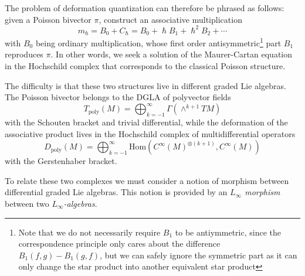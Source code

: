 \documentclass[
  12pt,
  a4paper, oneside
]{report}
\renewcommand{\hbar}{\hslash}
\theoremstyle{bolddef}
\theoremstyle{remark}
\numberwithin{equation}{chapter}
\begin{document}
The problem of deformation quantization can therefore be phrased as follows:
given a Poisson bivector $\pi$, construct an associative multiplication
\begin{equation}
m_{\hbar} = B_{0} + C_{\hbar} = B_{0} + \hbar B_{1} + \hbar^{2} B_{2} + \cdots
\end{equation}
with $B_{0}$ being ordinary multiplication, whose first order antisymmetric\footnote{Note that we do not necessarily require $B_{1}$ to be antiymmetric, since the correspondence principle only cares about the difference $B_{1}(f,g) - B_{1}(g,f)$, but we can safely ignore the symmetric part as it can only change the star product into another equivalent star product} part $B_{1}$ reproduces $\pi$. In other words, we seek
a solution of the Maurer-Cartan equation in the Hochschild complex that
corresponds to the classical Poisson structure.

The difficulty is that these two structures live in different graded Lie
algebras. The Poisson bivector belongs to the DGLA of
polyvector fields
\begin{equation}
T_{\mathrm{poly}}(M) = \bigoplus_{k=-1}^{\infty}
\Gamma(\wedge^{k+1} TM)
\end{equation}
with the Schouten bracket and trivial differential, while the deformation of the associative product lives in the Hochschild complex of multidifferential operators
\begin{equation}
D_{\mathrm{poly}}(M) = \bigoplus_{k=-1}^{\infty}
\mathrm{Hom}(C^\infty(M)^{\otimes (k+1)},C^\infty(M))
\end{equation}
with the Gerstenhaber bracket.

To relate these two complexes we must consider a notion of morphism
between differential graded Lie algebras. This notion is provided by an \textit{$L_{\infty}$ morphism} between two \textit{$L_{\infty}$-algebras}.
\end{document}
